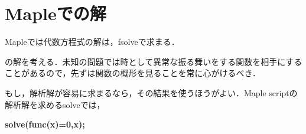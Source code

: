 \documentclass{article}
\begin{document}
\section{\textbf{Mapleでの解}}
\begin{maplegroup}
\begin{Maple Normal}{
Mapleでは代数方程式の解は，fsolveで求まる．}\end{Maple Normal}

\begin{center}
\begin{Maple Normal}{
}\end{Maple Normal}
\end{center}
\begin{Maple Normal}{
の解を考える．未知の問題では時として異常な振る舞いをする関数を相手にすることがあるので，先ずは関数の概形を見ることを常に心がけるべき．}\end{Maple Normal}
\end{maplegroup}
\begin{maplegroup}
\begin{mapleinput}
\end{mapleinput}
\end{maplegroup}
\begin{maplegroup}
\begin{mapleinput}
\end{mapleinput}
\mapleresult
\begin{maplelatex}
\end{maplelatex}
\end{maplegroup}
\begin{maplegroup}
\begin{mapleinput}
\end{mapleinput}
\mapleresult
{}
\end{maplegroup}
\begin{maplegroup}
\begin{Maple Normal}{
もし，解析解が容易に求まるなら，その結果を使うほうがよい．Maple scriptの解析解を求めるsolveでは，}\end{Maple Normal}

\textbf{solve(func(x)=0,x);}\mapleresult
\begin{maplelatex}
\end{maplelatex}
\end{maplegroup}
\end{document}
